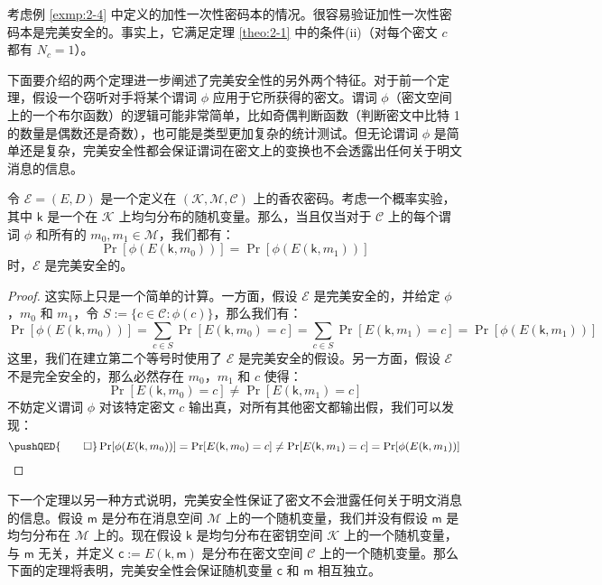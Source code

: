 \begin{example}
考虑例 \ref{exmp:2-4} 中定义的加性一次性密码本的情况。很容易验证加性一次性密码本是完美安全的。事实上，它满足定理 \ref{theo:2-1} 中的条件(ii)（对每个密文 $c$ 都有 $N_c=1$）。
\end{example}


下面要介绍的两个定理进一步阐述了完美安全性的另外两个特征。对于前一个定理，假设一个窃听对手将某个谓词 $\phi$ 应用于它所获得的密文。谓词 $\phi$（密文空间上的一个布尔函数）的逻辑可能非常简单，比如奇偶判断函数（判断密文中比特 1 的数量是偶数还是奇数），也可能是类型更加复杂的统计测试。但无论谓词 $\phi$ 是简单还是复杂，完美安全性都会保证谓词在密文上的变换也不会透露出任何关于明文消息的信息。

\begin{theorem}\label{theo:2-3}
令 $\mathcal{E}=(E,D)$ 是一个定义在 $(\mathcal{K},\mathcal{M},\mathcal{C})$ 上的香农密码。考虑一个概率实验，其中 $\mathsf{k}$ 是一个在 $\mathcal{K}$ 上均匀分布的随机变量。那么，当且仅当对于 $\mathcal{C}$ 上的每个谓词 $\phi$ 和所有的 $m_0,m_1\in\mathcal{M}$，我们都有：
$$
\Pr[\phi(E(\mathsf{k},m_0))]=
\Pr[\phi(E(\mathsf{k}, m_1))]
$$
时，$\mathcal{E}$ 是完美安全的。
\end{theorem}

\begin{proof}
这实际上只是一个简单的计算。一方面，假设 $\mathcal{E}$ 是完美安全的，并给定 $\phi$，$m_0$ 和 $m_1$，令 $S:=\{c\in\mathcal{C}:\phi(c)\}$，那么我们有：
$$
\Pr[\phi(E(\mathsf{k}, m_0))]=\sum_{c\in S}\Pr[E(\mathsf{k}, m_0) = c]=\sum_{c\in S}\Pr[E(\mathsf{k}, m_1) = c]=\Pr[\phi(E(\mathsf{k}, m_1) )]
$$
这里，我们在建立第二个等号时使用了 $\mathcal{E}$ 是完美安全的假设。另一方面，假设 $\mathcal{E}$ 不是完全安全的，那么必然存在 $m_0$，$m_1$ 和 $c$ 使得：
$$
\Pr[E(\mathsf{k},m_0)=c]\neq
\Pr[E(\mathsf{k},m_1)=c]
$$
不妨定义谓词 $\phi$ 对该特定密文 $c$ 输出真，对所有其他密文都输出假，我们可以发现：
\[
\pushQED{\qed}
\Pr[\phi(E(\mathsf{k}, m_0))]= 
\Pr[E(\mathsf{k}, m_0) = c]\neq
\Pr[E(\mathsf{k}, m_1) = c]=
\Pr[\phi(E(\mathsf{k}, m_1))]\qedhere
\]
\end{proof}

下一个定理以另一种方式说明，完美安全性保证了密文不会泄露任何关于明文消息的信息。假设 $\mathsf{m}$ 是分布在消息空间 $\mathcal{M}$ 上的一个随机变量，我们并没有假设 $\mathsf{m}$ 是均匀分布在 $\mathcal{M}$ 上的。现在假设 $\mathsf{k}$ 是均匀分布在密钥空间 $\mathcal{K}$ 上的一个随机变量，与 $\mathsf{m}$ 无关，并定义 $\mathsf{c}:=E(\mathsf{k},\mathsf{m})$ 是分布在密文空间 $\mathcal{C}$ 上的一个随机变量。那么下面的定理将表明，完美安全性会保证随机变量 $\mathsf{c}$ 和 $\mathsf{m}$ 相互独立。

